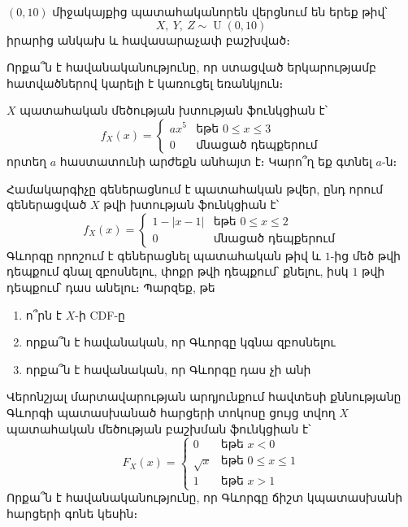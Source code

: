 \begin{problem}
$(0, 10)$ միջակայքից պատահականորեն վերցնում են երեք թիվ՝
\[
X,\ Y,\ Z \sim \operatorname{U}(0, 10)
\]
իրարից անկախ և հավասարաչափ բաշխված։

Որքա՞ն է հավանականությունը, որ ստացված երկարությամբ հատված\-ներով կարելի է կառուցել եռանկյուն։
\end{problem}

\begin{problem}
$X$ պատահական մեծության խտության ֆունկցիան է՝
\[
f_X(x) = \begin{cases}
    ax^5& \text{եթե }0\le x \le 3 \\
    0& \text{մնացած դեպքերում}
\end{cases}
\]
որտեղ $a$ հաստատունի արժեքն անհայտ է։ Կարո՞ղ եք գտնել $a$-ն։
\end{problem}

\begin{problem}
Համակարգիչը գեներացնում է պատահական թվեր, ընդ որում գեներացված $X$ թվի խտության ֆունկցիան է՝
\[
f_X(x) = \begin{cases}
    1 - |x-1|& \text{եթե }0\le x \le 2 \\
    0& \text{մնացած դեպքերում}
\end{cases}
\]
Գևորգը որոշում է գեներացնել պատահական թիվ և $1$-ից մեծ թվի դեպքում գնալ զբոսնելու, փոքր թվի դեպքում՝ քնելու, իսկ $1$ թվի դեպքում՝ դաս անելու։ Պարզեք, թե
\begin{enumerate}
\item ո՞րն է $X$-ի {\rm CDF}-ը
\item որքա՞ն է հավանական, որ Գևորգը կգնա զբոսնելու
\item որքա՞ն է հավանական, որ Գևորգը դաս չի անի
\end{enumerate}
\end{problem}

\begin{problem}
Վերոնշյալ մարտավարության արդյունքում հավտեսի  քննությանը Գևորգի պատասխանած հարցերի տոկոսը ցույց տվող $X$ պատահական մեծության բաշխման ֆունկցիան է՝
\[
F_X(x) = \begin{cases}
    0& \text{եթե } x < 0 \\
    \sqrt{x}& \text{եթե } 0 \le x \le 1 \\
    1& \text{եթե } x > 1
\end{cases}
\]
Որքա՞ն է հավանականությունը, որ Գևորգը ճիշտ կպատասխանի հար\-ցերի գոնե կեսին։  
\end{problem}